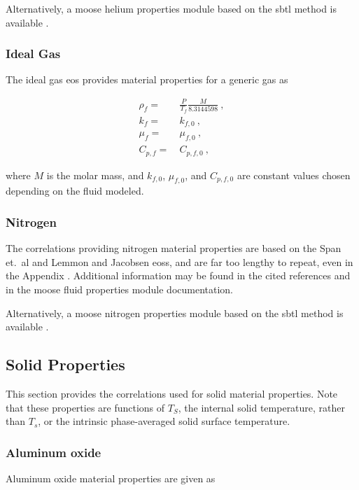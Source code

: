 \begin{appendices}
\noindent Alternatively, a \gls{moose} helium properties module based on the \gls{sbtl} method is available \cite{kunick}.

\subsubsection*{Ideal Gas}
The ideal gas \gls{eos} provides material properties for a generic gas as

\begin{subequations}
\begin{align}
\rho_f=&\ \frac{P}{T_f}\frac{M}{8.3144598}\ ,\\
k_f=&\ k_{f,0}\ ,\\
\mu_f=&\ \mu_{f,0}\ ,\\
C_{p,f}=&\ C_{p,f,0}\ ,
\end{align}
\end{subequations}

\noindent where \(M\) is the molar mass, and \(k_{f,0}\), \(\mu_{f,0}\), and \(C_{p,f,0}\) are constant values chosen depending on the fluid modeled.

\subsubsection*{Nitrogen}
The correlations providing nitrogen material properties are based on the Span et.\ al and Lemmon and Jacobsen \glspl{eos}, and are far too lengthy to repeat, even in the Appendix \cite{span,lemmon}. Additional information may be found in the cited references and in the \gls{moose} fluid properties module documentation.

Alternatively, a \gls{moose} nitrogen properties module based on the \gls{sbtl} method is available \cite{kunick}.

\subsection*{Solid Properties}

This section provides the correlations used for solid material properties. Note that these properties are functions of \(T_S\), the internal solid temperature, rather than \(T_s\), or the intrinsic phase-averaged solid surface temperature. 

\subsubsection*{Aluminum oxide}
Aluminum oxide material properties are given as \cite{SANA,aluminum_oxide_cp}


\end{appendices}

